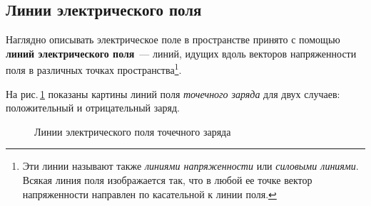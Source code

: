 \documentclass[main.tex]{subfiles}
\begin{document}

\pagestyle{empty}

\begin{NoHyper} %

\setcounter{section}{7
}
\addtocounter{section}{-1} 

\section{Линии электрического поля}


Наглядно описывать электрическое поле в пространстве принято с помощью \textbf{линий электрического поля}~--- линий, идущих вдоль векторов напряженности поля в различных точках пространства\footnote{Эти линии называют также \emph{линиями напряженности} или \emph{силовыми линиями}. Всякая линия поля изображается так, что в любой ее точке вектор напряженности направлен по касательной к линии поля.}.

На рис.\,\ref{fig:p99} показаны картины линий поля \emph{точечного заряда} для двух случаев: положительный и отрицательный заряд.

    \begin{figure}[H]
    \centering

\caption{Линии электрического поля точечного заряда}
\label{fig:p99}
\end{figure}


\end{NoHyper}
\end{document}
